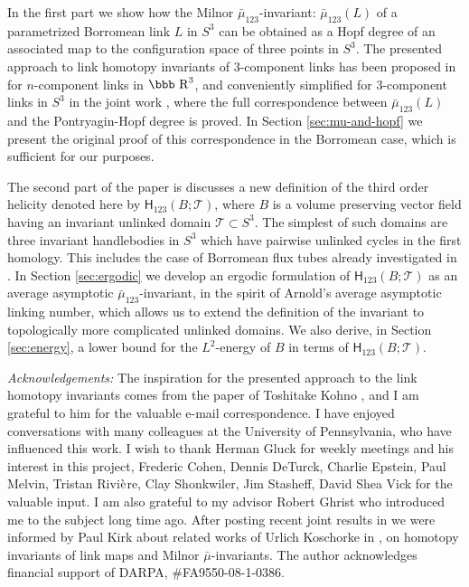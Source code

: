\documentclass[12pt]{article}
\numberwithin{equation}{section}
\newcommand{\R}{\mbox{\bbb R}}       %
\newcommand{\no}{\noindent}
\begin{document}
In the first part we show how the Milnor $\bar{\mu}_{123}$-invariant: $\bar{\mu}_{123}(L)$ of a parametrized Borromean link $L$ in $S^3$ can be obtained as a Hopf degree of an associated map to the configuration space of three points in $S^3$. The presented approach to link homotopy invariants of 3-component links has been proposed in \cite{Kohno02} for $n$-component links in $\R^3$, and conveniently simplified for 3-component links in $S^3$ in the joint work \cite{Deturck-Gluck-Melvin-Shonkwiler08}, where the full correspondence between $\bar{\mu}_{123}(L)$ and the Pontryagin-Hopf degree is proved. In Section \ref{sec:mu-and-hopf} we present the original proof of this correspondence in the Borromean case, which is sufficient for our purposes.  

The second part of the paper is discusses a new definition of the third order helicity denoted here by $\mathsf{H}_{123}(B;\mathcal{T})$, where $B$ is a volume preserving vector field having an invariant unlinked domain $\mathcal{T}\subset S^3$. The simplest of such domains are three invariant 
handlebodies in $S^3$ which have pairwise unlinked 
cycles in the first homology. This includes the case of Borromean flux tubes already investigated in  \cite{Berger90, Laurence-Stredulinsky00b}. In Section \ref{sec:ergodic}  we develop an ergodic formulation of $\mathsf{H}_{123}(B;\mathcal{T})$ as an average asymptotic $\bar{\mu}_{123}$-invariant, in the spirit of Arnold's average asymptotic linking number, which allows us to extend the definition of the invariant to topologically more complicated unlinked domains. We also derive, in Section \ref{sec:energy},  a lower 
bound for the $L^2$-energy of $B$ in terms of $\mathsf{H}_{123}(B;\mathcal{T})$. 


\vspace{1cm}

\no\emph{Acknowledgements:} The inspiration for the presented approach to the link homotopy invariants  comes from the paper of Toshitake Kohno \cite{Kohno02}, and I am grateful to him for the valuable e-mail correspondence. I have enjoyed conversations with many colleagues at the University of Pennsylvania, who have influenced this work. I wish to thank Herman Gluck for weekly meetings and his interest in this project, Frederic Cohen, Dennis DeTurck, Charlie Epstein, Paul Melvin, Tristan Rivi$\grave{\rm e}$re, Clay Shonkwiler, Jim Stasheff, David Shea Vick for the valuable input.  I am also grateful to my advisor 
Robert Ghrist who introduced me to the subject long time ago.  After posting recent joint results in \cite{Deturck-Gluck-Melvin-Shonkwiler08} we were informed by Paul Kirk about related works of Urlich Koschorke in \cite{Koschorke97, Koschorke04}, on homotopy invariants of link maps and Milnor $\bar{\mu}$-invariants. The author acknowledges financial support of DARPA, \#FA9550-08-1-0386.
\end{document}
